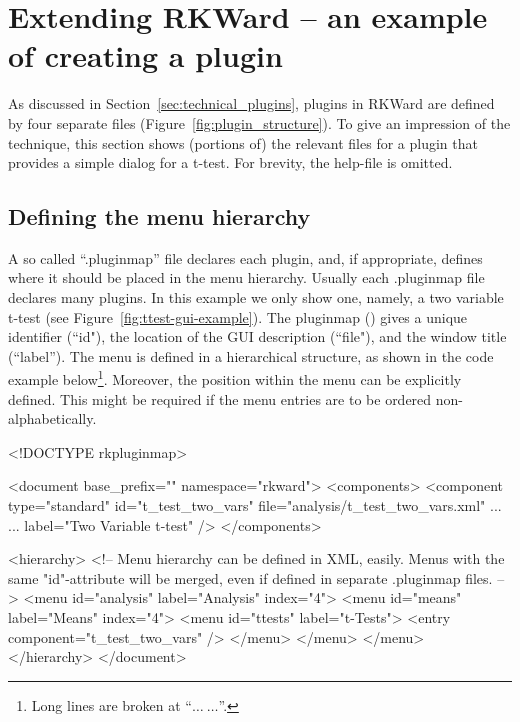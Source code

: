 \section{Extending RKWard -- an example of creating a plugin}
\label{sec:example_plugin}
As discussed in Section~\ref{sec:technical_plugins}, plugins in RKWard are
defined by four separate files (Figure~\ref{fig:plugin_structure}). To give an impression of the technique,
this section shows (portions of) the relevant files for a plugin that provides
a simple dialog for a t-test. For brevity, the help-file is omitted.

\subsection{Defining the menu hierarchy}
\label{sec:defining_menu_hierarchy}
A so called ``.pluginmap'' file declares each plugin, and, if appropriate, defines where it should
be placed in the menu hierarchy. Usually each .pluginmap file declares many plugins. In this example
we only show one, namely, a two variable t-test (see Figure~\ref{fig:ttest-gui-example}). 
The pluginmap () gives a unique identifier (``id"), the location of the GUI description (``file"), and the window title (``label''). The menu
is defined in a hierarchical structure, as shown in the code example below\footnote{Long lines are broken at ``$\ldots~\ldots$''.}. Moreover, the position within the menu can be explicitly defined.
This might be required if the menu entries are to be ordered non-alphabetically.

\begin{footnotesize}
\begin{Code}
<!DOCTYPE rkpluginmap>

<document base_prefix="" namespace="rkward">
  <components>
    <component type="standard" id="t_test_two_vars" file="analysis/t_test_two_vars.xml" ...
      ... label="Two Variable t-test" />
  </components>

  <hierarchy>
    <!-- Menu hierarchy can be defined in XML, easily.
    Menus with the same "id"-attribute will be merged, even if defined in
    separate .pluginmap files. -->
    <menu id="analysis" label="Analysis" index="4">
      <menu id="means" label="Means" index="4">
        <menu id="ttests" label="t-Tests">
          <entry component="t_test_two_vars" />
        </menu>
      </menu>
    </menu>
  </hierarchy>
</document>
\end{Code}
\end{footnotesize}


